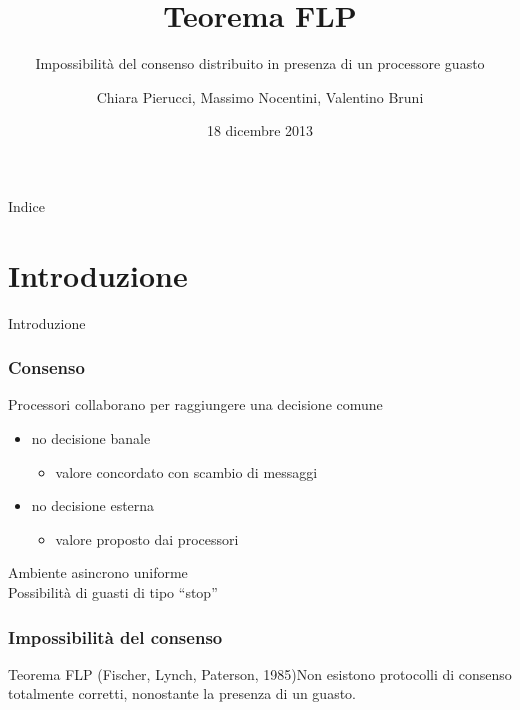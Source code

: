\documentclass{beamer}
\begin{document}
\title[$\qquad\qquad\qquad\qquad\qquad\qquad\qquad\qquad\qquad\qquad\qquad\qquad\qquad\qquad\qquad\qquad\qquad\qquad\qquad$Pierucci, Nocentini, Bruni]{\Huge\textbf{Teorema FLP}}
\subtitle{\scriptsize Impossibilità del consenso distribuito in presenza di un processore guasto}
\author[Teorema FLP - Impossibilità del consenso distribuito in presenza di un processore guasto]{Chiara Pierucci, Massimo Nocentini, Valentino Bruni}
\date{18 dicembre 2013}
\frame{\titlepage}

\begin{frame}{Indice}\tableofcontents\end{frame}


\section{Introduzione}
\begin{frame}\begin{block}{}\centering\LARGE Introduzione\end{block}\vspace{0.5cm}\end{frame}


\begin{frame}\frametitle{Consenso}
Processori collaborano per raggiungere una decisione comune 
\begin{itemize}
\item no decisione banale \begin{itemize}\item valore concordato con scambio di messaggi\end{itemize}
\item no decisione esterna \begin{itemize}\item valore proposto dai processori\end{itemize}
\end{itemize}
\vspace*{.5cm}
Ambiente asincrono uniforme
\\\vspace*{.5cm}
Possibilità di guasti di tipo ``stop''
\end{frame}


\begin{frame}\frametitle{Impossibilità del consenso}
\begin{block}{Teorema FLP (Fischer, Lynch, Paterson, 1985)}Non esistono protocolli di consenso totalmente corretti, nonostante la presenza di un guasto.\end{block}
\end{frame}
\end{document}
